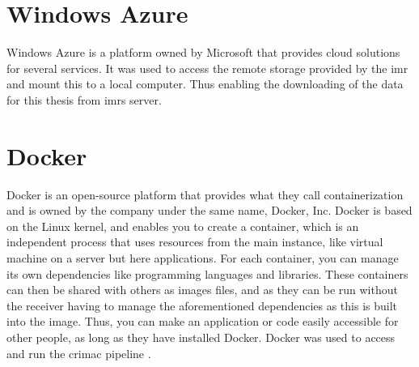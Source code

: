               


    \section{Windows Azure} \label{Windows Azure}
        Windows Azure \cite{azure} is a platform owned by Microsoft that provides cloud solutions for several services. It was used to access the remote storage provided by the \gls{imr} and mount this to a local computer. Thus enabling the downloading of the data for this thesis from \gls{imr}s server. 
    
    \section{Docker} \label{Docker}
        Docker \cite{docker} is an open-source platform that provides what they call containerization and is owned by the company under the same name, Docker, Inc. Docker is based on the Linux kernel, and enables you to create a container, which is an independent process that uses resources from the main instance, like virtual machine on a server but here applications. For each container, you can manage its own dependencies like programming languages and libraries. These containers can then be shared with others as images files, and as they can be run without the receiver having to manage the aforementioned dependencies as this is built into the image. Thus, you can make an application or code easily accessible for other people, as long as they have installed Docker. Docker was used to access and run the \gls{crimac} pipeline \cite{crimac_pipeline}.
        
